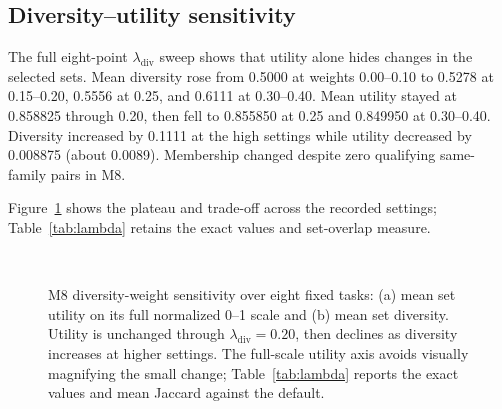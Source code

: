 \documentclass[conference]{IEEEtran}
\begin{document}
\subsection{Diversity--utility sensitivity}
The full eight-point $\lambda_{\mathrm{div}}$ sweep shows that utility alone hides changes in the selected sets. Mean diversity rose from 0.5000 at weights 0.00--0.10 to 0.5278 at 0.15--0.20, 0.5556 at 0.25, and 0.6111 at 0.30--0.40. Mean utility stayed at 0.858825 through 0.20, then fell to 0.855850 at 0.25 and 0.849950 at 0.30--0.40. Diversity increased by 0.1111 at the high settings while utility decreased by 0.008875 (about 0.0089). Membership changed despite zero qualifying same-family pairs in M8.

Figure~\ref{fig:lambda-sweep} shows the plateau and trade-off across the recorded settings; Table~\ref{tab:lambda} retains the exact values and set-overlap measure.

\begin{figure}[t]
\centering
{}
\\[-2pt]
\caption{M8 diversity-weight sensitivity over eight fixed tasks: (a) mean set utility on its full normalized 0--1 scale and (b) mean set diversity. Utility is unchanged through $\lambda_{\mathrm{div}}=0.20$, then declines as diversity increases at higher settings. The full-scale utility axis avoids visually magnifying the small change; Table~\ref{tab:lambda} reports the exact values and mean Jaccard against the default.}
\label{fig:lambda-sweep}
\end{figure}
\end{document}
